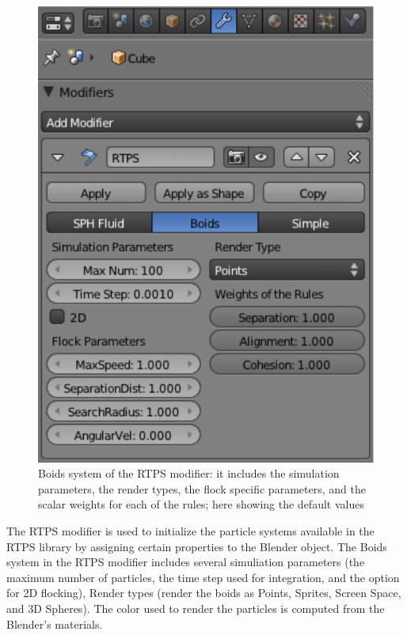 \begin{figure}[htbp]
\begin{center}
\includegraphics[scale=0.8]{figures/modifier.pdf}
\caption{Boids system of the RTPS modifier: it includes the simulation parameters, the render types, the flock specific parameters, and the scalar weights for each of the rules; here showing the default values}
\label{ui}
\end{center}
\end{figure}

The RTPS modifier is used to initialize the particle systems available in the RTPS library by assigning certain properties to the Blender object. The Boids system in the RTPS modifier includes several simuliation parameters (the maximum number of particles, the time step used for integration, and the option for 2D flocking), Render types (render the boids as Points, Sprites, Screen Space, and 3D Spheres). The color used to render the particles is computed  from the Blender's materials.

